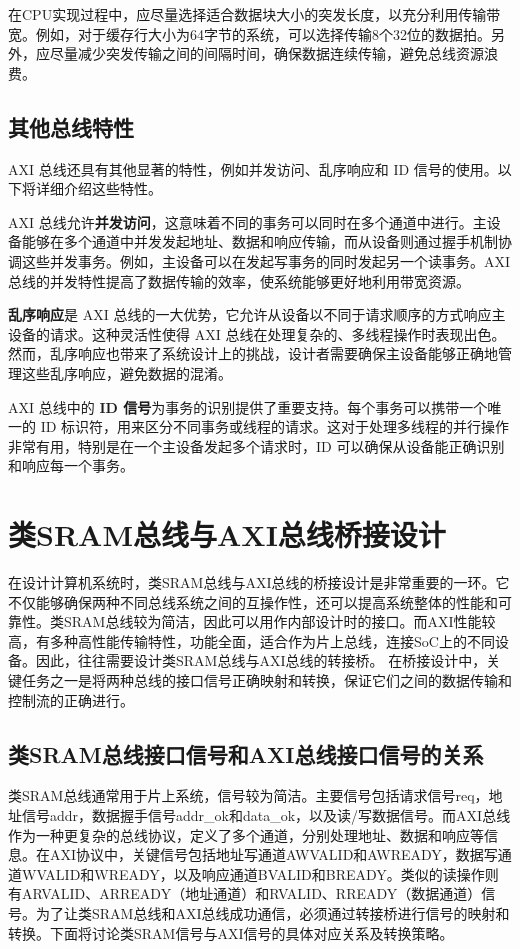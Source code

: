 在CPU实现过程中，应尽量选择适合数据块大小的突发长度，以充分利用传输带宽。例如，对于缓存行大小为64字节的系统，可以选择传输8个32位的数据拍。另外，应尽量减少突发传输之间的间隔时间，确保数据连续传输，避免总线资源浪费。

\subsection{其他总线特性}\label{sec:08-bus-and-soc-024}

AXI 总线还具有其他显著的特性，例如并发访问、乱序响应和 ID 信号的使用。以下将详细介绍这些特性。

AXI 总线允许\textbf{并发访问}，这意味着不同的事务可以同时在多个通道中进行。主设备能够在多个通道中并发发起地址、数据和响应传输，而从设备则通过握手机制协调这些并发事务。例如，主设备可以在发起写事务的同时发起另一个读事务。AXI 总线的并发特性提高了数据传输的效率，使系统能够更好地利用带宽资源。

\textbf{乱序响应}是 AXI 总线的一大优势，它允许从设备以不同于请求顺序的方式响应主设备的请求。这种灵活性使得 AXI 总线在处理复杂的、多线程操作时表现出色。然而，乱序响应也带来了系统设计上的挑战，设计者需要确保主设备能够正确地管理这些乱序响应，避免数据的混淆。

AXI 总线中的 \textbf{ID 信号}为事务的识别提供了重要支持。每个事务可以携带一个唯一的 ID 标识符，用来区分不同事务或线程的请求。这对于处理多线程的并行操作非常有用，特别是在一个主设备发起多个请求时，ID 可以确保从设备能正确识别和响应每一个事务。

\section{类SRAM总线与AXI总线桥接设计}\label{sec:08-bus-and-soc-025}

在设计计算机系统时，类SRAM总线与AXI总线的桥接设计是非常重要的一环。它不仅能够确保两种不同总线系统之间的互操作性，还可以提高系统整体的性能和可靠性。类SRAM总线较为简洁，因此可以用作内部设计时的接口。而AXI性能较高，有多种高性能传输特性，功能全面，适合作为片上总线，连接SoC上的不同设备。因此，往往需要设计类SRAM总线与AXI总线的转接桥。
在桥接设计中，关键任务之一是将两种总线的接口信号正确映射和转换，保证它们之间的数据传输和控制流的正确进行。

\subsection{类SRAM总线接口信号和AXI总线接口信号的关系}\label{sec:08-bus-and-soc-026}

类SRAM总线通常用于片上系统，信号较为简洁。主要信号包括请求信号req，地址信号addr，数据握手信号addr\_ok和data\_ok，以及读/写数据信号。而AXI总线作为一种更复杂的总线协议，定义了多个通道，分别处理地址、数据和响应等信息。在AXI协议中，关键信号包括地址写通道AWVALID和AWREADY，数据写通道WVALID和WREADY，以及响应通道BVALID和BREADY。类似的读操作则有ARVALID、ARREADY（地址通道）和RVALID、RREADY（数据通道）信号。为了让类SRAM总线和AXI总线成功通信，必须通过转接桥进行信号的映射和转换。下面将讨论类SRAM信号与AXI信号的具体对应关系及转换策略。

